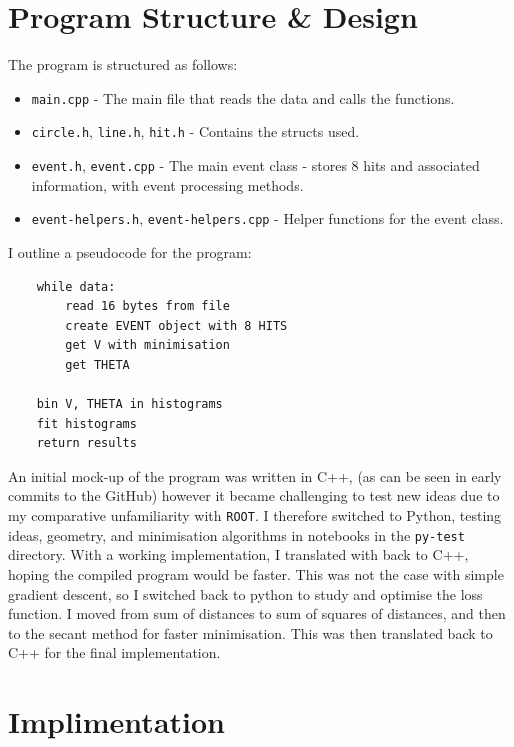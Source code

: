 \documentclass[11pt]{article}
\begin{document}
\section{Program Structure \& Design}
\label{sec:program}
The program is structured as follows:
\begin{itemize}
    \item \texttt{main.cpp} - The main file that reads the data and calls the functions.
    \item \texttt{circle.h}, \texttt{line.h}, \texttt{hit.h} - Contains the structs used.
    \item \texttt{event.h}, \texttt{event.cpp} - The main event class - stores 8 hits and associated information, with event processing methods.
    \item \texttt{event-helpers.h}, \texttt{event-helpers.cpp} - Helper functions for the event class.
\end{itemize}


I outline a pseudocode for the program:
\begin{verbatim}
    while data:
        read 16 bytes from file
        create EVENT object with 8 HITS
        get V with minimisation
        get THETA
    
    bin V, THETA in histograms
    fit histograms
    return results
\end{verbatim}
An initial mock-up of the program was written in C++, (as can be seen in early commits to the GitHub) however it became challenging to test new ideas due to my comparative unfamiliarity with \texttt{ROOT}. I therefore switched to Python, testing ideas, geometry, and minimisation algorithms in notebooks in the \texttt{py-test} directory. With a working implementation, I translated with back to C++, hoping the compiled program would be faster. This was not the case with simple gradient descent, so I switched back to python to study and optimise the loss function. I moved from sum of distances to sum of squares of distances, and then to the secant method for faster minimisation. This was then translated back to C++ for the final implementation.

\section{Implimentation}
\label{sec:implimentation}
\end{document}
